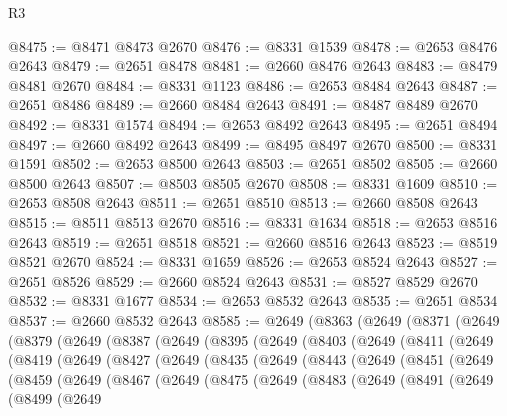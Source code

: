 \begin{lexlean}{R3}
\begin{coremodule}
@8475 := @8471 @8473 @2670
@8476 := @8331 @1539
@8478 := @2653 @8476 @2643
@8479 := @2651 @8478
@8481 := @2660 @8476 @2643
@8483 := @8479 @8481 @2670
@8484 := @8331 @1123
@8486 := @2653 @8484 @2643
@8487 := @2651 @8486
@8489 := @2660 @8484 @2643
@8491 := @8487 @8489 @2670
@8492 := @8331 @1574
@8494 := @2653 @8492 @2643
@8495 := @2651 @8494
@8497 := @2660 @8492 @2643
@8499 := @8495 @8497 @2670
@8500 := @8331 @1591
@8502 := @2653 @8500 @2643
@8503 := @2651 @8502
@8505 := @2660 @8500 @2643
@8507 := @8503 @8505 @2670
@8508 := @8331 @1609
@8510 := @2653 @8508 @2643
@8511 := @2651 @8510
@8513 := @2660 @8508 @2643
@8515 := @8511 @8513 @2670
@8516 := @8331 @1634
@8518 := @2653 @8516 @2643
@8519 := @2651 @8518
@8521 := @2660 @8516 @2643
@8523 := @8519 @8521 @2670
@8524 := @8331 @1659
@8526 := @2653 @8524 @2643
@8527 := @2651 @8526
@8529 := @2660 @8524 @2643
@8531 := @8527 @8529 @2670
@8532 := @8331 @1677
@8534 := @2653 @8532 @2643
@8535 := @2651 @8534
@8537 := @2660 @8532 @2643
@8585 := @2649
    (@8363
      (@2649
        (@8371
          (@2649
            (@8379
              (@2649
                (@8387
                  (@2649
                    (@8395
                      (@2649
                        (@8403
                          (@2649
                            (@8411
                              (@2649
                                (@8419
                                  (@2649
                                    (@8427
                                      (@2649
                                        (@8435
                                          (@2649
                                            (@8443
                                              (@2649
                                                (@8451
                                                  (@2649
                                                    (@8459
                                                      (@2649
                                                        (@8467
                                                          (@2649
                                                            (@8475
                                                              (@2649
                                                                (@8483
                                                                  (@2649
                                                                    (@8491
                                                                      (@2649
                                                                        (@8499
                                                                          (@2649

\end{coremodule}
\end{lexlean}
